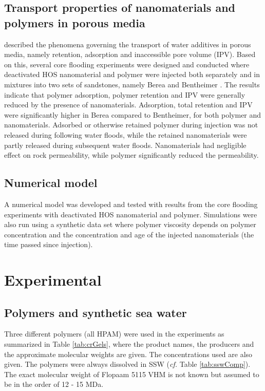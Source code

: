 \documentclass[nanomaterials,article,submit,moreauthors,pdftex]{Definitions/mdpi}
\begin{document}
\subsection{Transport properties of nanomaterials and polymers in porous media}
\citet{Lotsch1985} described the phenomena governing the transport of water additives in porous media, namely retention, adsorption and inaccessible pore volume (IPV). Based on this, several core flooding experiments were designed and conducted where deactivated HOS nanomaterial and polymer were injected both separately and in mixtures into two sets of sandstones, namely Berea and Bentheimer \citep{Najafiazar2016}. The results indicate that polymer adsorption, polymer retention and IPV were generally reduced by the presence of nanomaterials. Adsorption, total retention and IPV were significantly higher in Berea compared to Bentheimer, for both polymer and nanomaterials. Adsorbed or otherwise retained polymer during injection was not released during following water floods, while the retained nanomaterials were partly released during subsequent water floods. Nanomaterials had negligible effect on rock permeability, while polymer significantly reduced the permeability.

\subsection{Numerical model}
A numerical model was developed and tested with results from the core flooding experiments with deactivated HOS nanomaterial and polymer. Simulations were also run using a synthetic data set where polymer viscosity depends on polymer concentration and the concentration and age of the injected nanomaterials (the time passed since injection).
 
\section{Experimental}
\subsection{Polymers and synthetic sea water}
Three different polymers (all HPAM) were used in the experiments as summarized in Table \ref{tab:crGels}, where the product names, the producers and the approximate molecular weights are given. The concentrations used are also given. The polymers were always dissolved in SSW (\textit{cf.} Table \ref{tab:sswComp}). The exact molecular weight of Flopaam 5115 VHM is not known but assumed to be in the order of 12 - 15 MDa.
\end{document}
